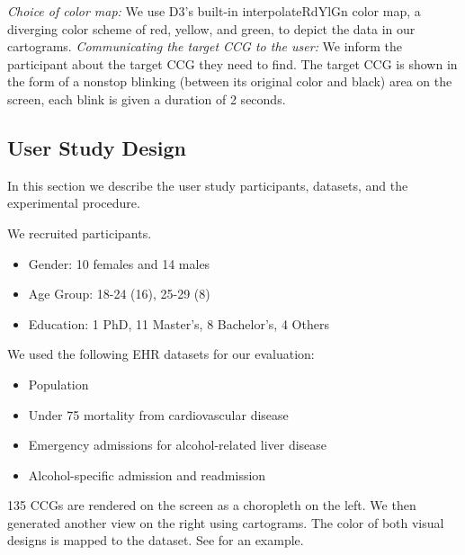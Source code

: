 \textit{Choice of color map:} We use D3's built-in interpolateRdYlGn color map, a diverging color scheme of red, yellow, and green, to depict the data in our cartograms. \textit{Communicating the target CCG to the user:} We inform the participant about the target CCG they need to find. The target CCG is shown in the form of a nonstop blinking (between its original color and black) area on the screen, each blink is given a duration of 2 seconds.

\subsection{User Study Design}\label{subsec:{User Study Design}}

In this section we describe the user study participants, datasets, and the experimental procedure.

 We recruited \pCount participants.

\begin{itemize}
    \setlength\itemsep{0px}
    \item Gender: 10 females and 14 males
    \item Age Group: 18-24 (16), 25-29 (8)
    \item Education: 1 PhD, 11 Master's, 8 Bachelor's, 4 Others
\end{itemize}

 We used the following EHR datasets for our evaluation:

\begin{itemize}
    \setlength\itemsep{0px}
    \item Population
    \item Under 75 mortality from cardiovascular disease
    \item Emergency admissions for alcohol-related liver disease
    \item Alcohol-specific admission and readmission
\end{itemize}

135 CCGs are rendered on the screen as a choropleth on the left. We then generated another view on the right using cartograms. The color of both visual designs is mapped to the dataset. See  for an example.

